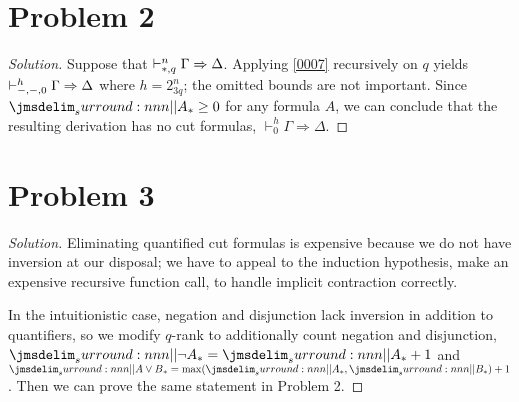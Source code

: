 \documentclass[a4paper]{article}
\begin{document}
\section*{Problem 2}\label{0008}
\begin{proof}[Solution]
  Suppose that $\mathrel{\vdash^{n}_{\mathord{*},q}} \Gamma \Rightarrow \Delta$.
  Applying \cref{0007} recursively on $q$ yields $\mathrel{\vdash^{h}_{-,-,0}} \Gamma \Rightarrow \Delta$ where $h = 2^n_{3q}$; the omitted bounds are not important.
  Since $\qRank{A} \geq 0$ for any formula $A$, we can conclude that the resulting derivation has no cut formulas, \ie $\vdash^h_0 \Gamma \Rightarrow \Delta$.
\end{proof}

\section*{Problem 3}\label{000A}
\begin{proof}[Solution]
  Eliminating quantified cut formulas is expensive because we do not have inversion at our disposal; we have to appeal to the induction hypothesis, \ie make an expensive recursive function call, to handle implicit contraction correctly.
  
  In the intuitionistic case, negation and disjunction lack inversion in addition to quantifiers, so we modify $q$-rank to additionally count negation and disjunction, \ie $\qRank{\lnot A} = \qRank{A} + 1$ and $\qRank{A \vee B} = \max(\qRank{A},\qRank{B}) + 1$.
  Then we can prove the same statement in Problem 2.
\end{proof}

% 
% 
\end{document}
